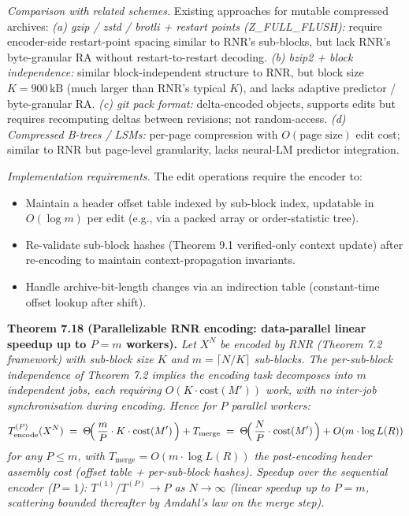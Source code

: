 \documentclass[
]{article}
\begin{document}
\emph{Comparison with related schemes.} Existing approaches for
mutable compressed archives:
\emph{(a) gzip / zstd / brotli + restart points (Z\_FULL\_FLUSH):}
require encoder-side restart-point spacing similar to RNR's sub-blocks,
but lack RNR's byte-granular RA without restart-to-restart decoding.
\emph{(b) bzip2 + block independence:} similar block-independent
structure to RNR, but block size $K = 900\,\mathrm{kB}$ (much larger
than RNR's typical $K$), and lacks adaptive predictor / byte-granular RA.
\emph{(c) git pack format:} delta-encoded objects, supports edits but
requires recomputing deltas between revisions; not random-access.
\emph{(d) Compressed B-trees / LSMs:} per-page compression with
$O(\text{page size})$ edit cost; similar to RNR but page-level
granularity, lacks neural-LM predictor integration.

\emph{Implementation requirements.} The edit operations require the
encoder to:
\begin{itemize}
\item Maintain a header offset table indexed by sub-block index,
updatable in $O(\log m)$ per edit (e.g., via a packed array or
order-statistic tree).
\item Re-validate sub-block hashes (Theorem 9.1 verified-only context
update) after re-encoding to maintain context-propagation invariants.
\item Handle archive-bit-length changes via an indirection table
(constant-time offset lookup after shift).
\end{itemize}

\textbf{Theorem 7.18 (Parallelizable RNR encoding: data-parallel
linear speedup up to $P = m$ workers).}
\emph{Let $X^N$ be encoded by RNR (Theorem 7.2 framework) with sub-block
size $K$ and $m = \lceil N/K \rceil$ sub-blocks. The per-sub-block
independence of Theorem 7.2 implies the encoding task decomposes into
$m$ independent jobs, each requiring $O(K \cdot \mathrm{cost}(M'))$
work, with no inter-job synchronisation during encoding. Hence for $P$
parallel workers:}
\[
T_{\mathrm{encode}}^{(P)}(X^N)
\;=\;
\Theta\!\Bigl(\,\frac{m}{P} \cdot K \cdot \mathrm{cost}(M')\,\Bigr) + T_{\mathrm{merge}}
\;=\;
\Theta\!\Bigl(\,\frac{N}{P} \cdot \mathrm{cost}(M')\,\Bigr) + O(m \cdot \log L(R))
\]
\emph{for any $P \leq m$, with $T_{\mathrm{merge}} = O(m \cdot \log L(R))$
the post-encoding header assembly cost (offset table + per-sub-block
hashes). Speedup over the sequential encoder ($P = 1$):
$T^{(1)} / T^{(P)} \to P$ as $N \to \infty$ (linear speedup up to
$P = m$, scattering bounded thereafter by Amdahl's law on the merge
step).}
\end{document}

